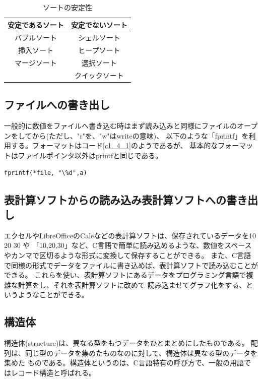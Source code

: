 \documentclass{jsarticle}
\begin{document}
    \begin{table}[htbp]
        \begin{center}
          \caption{ソートの安定性}
            \label{t1}
            \begin{tabular}{c|c}
                安定であるソート & 安定でないソート  \\ \hline
                バブルソート   & シェルソート     \\
                挿入ソート    & ヒープソート      \\
                マージソート   & 選択ソート      \\
                &クイックソート \\
                \end{tabular}
        \end{center}
    \end{table}

\subsection{ファイルへの書き出し}
一般的に数値をファイルヘ書き込む時はまず読み込みと同様にファイルのオープンをしてから(ただし、"r"を、"w"はwriteの意味)、
以下のような「fprintf」を利用する。フォーマットはコード\ref{c1_4_1}のようであるが、
基本的なフォーマットはファイルポインタ以外はprintfと同じである。

 \begin{lstlisting}[caption=ファイルへの書き込み\label{c1_4_1}]
   fprintf(*file, "\%d",a)
 \end{lstlisting}

\subsection{表計算ソフトからの読み込み表計算ソフトへの書き出し}
エクセルやLibreOfficeのCaleなどの表計算ソフトは、保存されているデータを10 20 30 や
「10,20,30」など、C言語で簡単に読み込めるような、数値をスペースやカンマで区切るような形式に変換して保存することができる。
また、C言語で同様の形式でデータをファイルに書き込めば、表計算ソフトで読み込むことができる。
これらを使い、表計算ソフトにあるデータをプログラミング言語で複雑な計算をし、それを表計算ソフトに改めて
読み込ませてグラフ化をする、というようなことができる。

\subsection{構造体}
構造体(structure)は、異なる型をもつデータをひとまとめにしたものである。
配列は、同じ型のデータを集めたものなのに対して、構造体は異なる型のデータを集めた
ものである。構造体というのは、C言語特有の呼び方で、一般の用語ではレコード構造と呼ばれる\cite{sort}。
\end{document}
